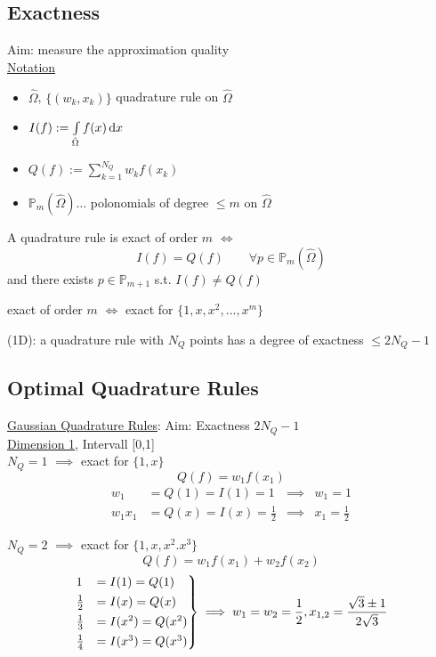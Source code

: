 \subsection{Exactness}
Aim: measure the approximation quality\\
\underline{Notation}
\begin{itemize}
	\item $\hat{\Omega}$, $\{(w_k,x_k)\}$ quadrature rule on $\hat{\Omega}$
	\item $I(f):= \int \limits_{\hat{\Omega}} f(x) \mathop{}\!\mathrm{d} x$
	\item $Q(f):= \displaystyle \sum_{k=1}^{N_Q} w_k f(x_k)$
	\item $\mathbb{P}_m(\hat{\Omega}) \dots $ polonomials of degree $\leq m$ on $\hat{\Omega}$
\end{itemize}
\begin{definition}
	A quadrature rule is exact of order $m$ $\iff$
	\begin{equation*}
		I(f)= Q(f) \qquad \forall p\in \mathbb{P}_m(\hat{\Omega})
	\end{equation*}
	and there exists $p\in \mathbb{P}_{m+1}$ s.t. $I(f)\neq Q(f)$
\end{definition}
\begin{lemma_}
	exact of order $m$ $\iff$ exact for $\{1,x,x^2,\dots,x^m \}$
\end{lemma_}

\begin{thrm}
	(1D): a quadrature rule with $N_Q$ points has a degree of exactness $\leq 2N_Q -1$
\end{thrm}

\subsection{Optimal Quadrature Rules}
\underline{Gaussian Quadrature Rules}: Aim: Exactness $2N_Q-1$
\vspace{0.5cm}\\
\underline{Dimension 1}, Intervall [0,1]\\
$N_Q = 1$ $\implies$ exact for $\{1,x\}$
\begin{equation*}
	Q(f)= w_1f(x_1)
\end{equation*}
\begin{align*}
	w_1 &= Q(1) = I(1)= 1 &\implies & w_1 = 1\\
	w_1x_1 &= Q(x) = I(x)= \frac{1}{2} &\implies & x_1 = \frac{1}{2}
\end{align*}

$N_Q = 2$ $\implies$ exact for $\{1,x,x^2.x^3\}$
\begin{equation*}
	Q(f)= w_1f(x_1) + w_2f(x_2)
\end{equation*}
\begin{align*}
\begin{rcases}
	1 &= I(1)=Q(1)  \\
	\frac{1}{2} &= I(x)= Q(x)  \\
	\frac{1}{3}&=I(x^2)= Q(x^2) \\
	\frac{1}{4}&=I(x^3)= Q(x^3)
\end{rcases} \implies w_1=w_2= \frac{1}{2}, x_{1,2} = \frac{\sqrt{3}\pm 1}{2\sqrt{3}}
\end{align*}

